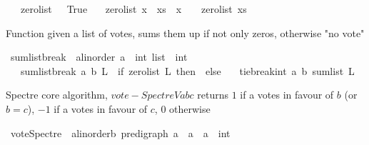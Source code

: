 \begin{isabellebody}
\ \ \ {\isachardoublequoteopen}zero{\isacharunderscore}{\kern0pt}list\ {\isacharbrackleft}{\kern0pt}{\isacharbrackright}{\kern0pt}\ {\isacharequal}{\kern0pt}\ True{\isachardoublequoteclose}\isanewline
\ \ {\isacharbar}{\kern0pt}\ {\isachardoublequoteopen}zero{\isacharunderscore}{\kern0pt}list\ {\isacharparenleft}{\kern0pt}x\ {\isacharhash}{\kern0pt}\ xs{\isacharparenright}{\kern0pt}\ {\isacharequal}{\kern0pt}\ {\isacharparenleft}{\kern0pt}{\isacharparenleft}{\kern0pt}x\ {\isacharequal}{\kern0pt}\ {}{\isacharparenright}{\kern0pt}\ {\isasymand}\ zero{\isacharunderscore}{\kern0pt}list\ xs{\isacharparenright}{\kern0pt}{\isachardoublequoteclose}%
\begin{isamarkuptext}%
Function given a list of votes, sums them up if not only zeros, otherwise "no vote"%
\end{isamarkuptext}\isamarkuptrue%
\isamarkupfalse%
\ sumlist{\isacharunderscore}{\kern0pt}break\ {\isacharcolon}{\kern0pt}{\isacharcolon}{\kern0pt}\ {\isachardoublequoteopen}{\isacharprime}{\kern0pt}a{\isacharcolon}{\kern0pt}{\isacharcolon}{\kern0pt}linorder\ {\isasymRightarrow}{\isacharprime}{\kern0pt}a\ {\isasymRightarrow}\ int\ list\ {\isasymRightarrow}\ int{\isachardoublequoteclose}\isanewline
\ \ \ {\isachardoublequoteopen}sumlist{\isacharunderscore}{\kern0pt}break\ a\ b\ L\ {\isacharequal}{\kern0pt}\ {\isacharparenleft}{\kern0pt}if\ {\isacharparenleft}{\kern0pt}zero{\isacharunderscore}{\kern0pt}list\ L{\isacharparenright}{\kern0pt}\ then\ {}\ else\isanewline
\ \ \ tie{\isacharunderscore}{\kern0pt}break{\isacharunderscore}{\kern0pt}int\ a\ b\ {\isacharparenleft}{\kern0pt}sum{\isacharunderscore}{\kern0pt}list\ L{\isacharparenright}{\kern0pt}{\isacharparenright}{\kern0pt}{\isachardoublequoteclose}%
\begin{isamarkuptext}%
Spectre core algorithm, $vote-Spectre V a b c$ returns 
     $1$ if a votes in favour of $b$ (or $b = c$),
     $-1$ if a votes in favour of $c$, $0$ otherwise%
\end{isamarkuptext}\isamarkuptrue%
\isamarkupfalse%
\ vote{\isacharunderscore}{\kern0pt}Spectre\ {\isacharcolon}{\kern0pt}{\isacharcolon}{\kern0pt}\ {\isachardoublequoteopen}{\isacharparenleft}{\kern0pt}{\isacharprime}{\kern0pt}a{\isacharcolon}{\kern0pt}{\isacharcolon}{\kern0pt}linorder{\isacharcomma}{\kern0pt}{\isacharprime}{\kern0pt}b{\isacharparenright}{\kern0pt}\ pre{\isacharunderscore}{\kern0pt}digraph\ {\isasymRightarrow}{\isacharprime}{\kern0pt}a\ {\isasymRightarrow}\ {\isacharprime}{\kern0pt}a\ {\isasymRightarrow}\ {\isacharprime}{\kern0pt}a\ {\isasymRightarrow}\ int{\isachardoublequoteclose}\ \isanewline

\end{isabellebody}
